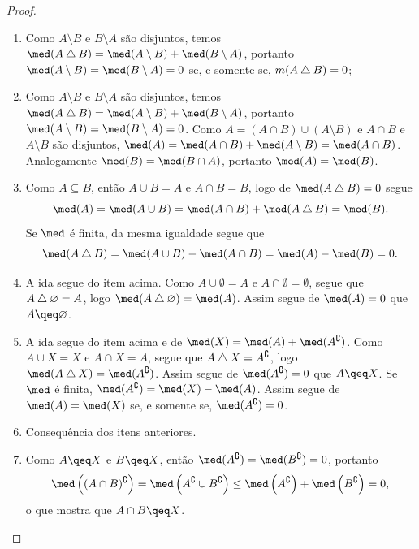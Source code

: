 \begin{proof}
	\begin{enumerate}
	\item Como $A \setminus B$ e $B \setminus A$ são disjuntos, temos $\med(A \difsim B) = \med(A \setminus B) + \med(B \setminus A)$, portanto $\med(A \setminus B) = \med(B \setminus A) = 0$ se, e somente se, $m(A \mathbin{\triangle} B) = 0$;
	\item Como $A \setminus B$ e $B \setminus A$ são disjuntos, temos $\med(A \difsim B) = \med(A \setminus B) + \med(B \setminus A)$, portanto $\med(A \setminus B) = \med(B \setminus A) = 0$. Como $A = (A \cap B) \cup (A \setminus B)$ e $A \cap B$ e $A \setminus B$ são disjuntos, $\med(A) = \med(A \cap B)+\med(A \setminus B) = \med(A \cap B)$. Analogamente $\med(B)=\med(B \cap A)$, portanto $\med(A) = \med(B)$.
	
	\item Como $A \subseteq B$, então $A \cup B = A$ e $A \cap B = B$, logo de $\med(A \difsim B)=0$ segue
		\begin{equation*}
		\med (A) = \med(A \cup B) = \med(A \cap B) + \med(A \difsim B) = \med(B).
		\end{equation*}
Se $\med$ é finita, da mesma igualdade segue que
	\begin{equation*}
	\med(A \difsim B) = \med(A \cup B) - \med(A \cap B) = \med(A) - \med(B) = 0.
	\end{equation*}

	\item A ida segue do item acima. Como $A \cup \emptyset = A$ e $A \cap \emptyset = \emptyset$, segue que $A \mathbin{\triangle} \varnothing = A$, logo $\med(A \difsim \emptyset) = \med(A)$. Assim segue de $\med(A)=0$ que $A \qeq \emptyset$.
	
	\item A ida segue do item acima e de $\med(X) = \med(A)+\med(A^\complement)$. Como $A \cup X = X$ e $A \cap X = A$, segue que $A \mathbin{\triangle} X = A^\complement$, logo $\med(A \difsim X) = \med(A^\complement)$. Assim segue de $\med(A^\complement)=0$ que $A \qeq X$.
Se $\med$ é finita, $\med(A^\complement) = \med(X)-\med(A)$. Assim segue de $\med(A)=\med(X)$ se, e somente se, $\med(A^\complement)=0$.

	\item Consequência dos itens anteriores.
	
	\item Como $A \qeq X$ e $B \qeq X$, então $\med(A^\complement)=\med(B^\complement)=0$, portanto
		\begin{equation*}
		\med\left((A \cap B)^\complement\right ) = \med\left(A^\complement \cup B^\complement\right) \leq \med\left(A^\complement\right)+\med\left(B^\complement\right)=0,
		\end{equation*}
o que mostra que $A \cap B \qeq X$.


\end{enumerate}
\end{proof}
